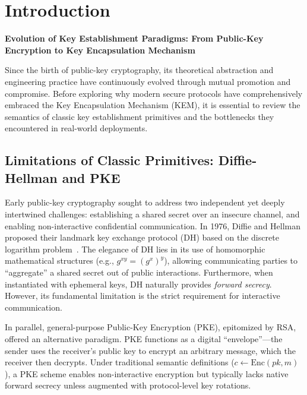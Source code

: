 \chapter{Introduction}
\begin{center}
\large \textbf{Evolution of Key Establishment Paradigms: From Public-Key Encryption to Key Encapsulation Mechanism}
\end{center}
\vspace{1em}

Since the birth of public-key cryptography, its theoretical abstraction and engineering practice have continuously evolved through mutual promotion and compromise. Before exploring why modern secure protocols have comprehensively embraced the Key Encapsulation Mechanism (KEM), it is essential to review the semantics of classic key establishment primitives and the bottlenecks they encountered in real-world deployments.

\section{Limitations of Classic Primitives: Diffie-Hellman and PKE}

Early public-key cryptography sought to address two independent yet deeply intertwined challenges: establishing a shared secret over an insecure channel, and enabling non-interactive confidential communication. In 1976, Diffie and Hellman proposed their landmark key exchange protocol (DH) based on the discrete logarithm problem~\cite{diffie2022new}. The elegance of DH lies in its use of homomorphic mathematical structures (e.g., $g^{xy} = (g^x)^y$), allowing communicating parties to ``aggregate'' a shared secret out of public interactions. Furthermore, when instantiated with ephemeral keys, DH naturally provides \textit{forward secrecy}. However, its fundamental limitation is the strict requirement for interactive communication.

In parallel, general-purpose Public-Key Encryption (PKE), epitomized by RSA, offered an alternative paradigm. PKE functions as a digital ``envelope''---the sender uses the receiver's public key to encrypt an arbitrary message, which the receiver then decrypts. Under traditional semantic definitions ($c \gets \text{Enc}(pk, m)$), a PKE scheme enables non-interactive encryption but typically lacks native forward secrecy unless augmented with protocol-level key rotations. 

